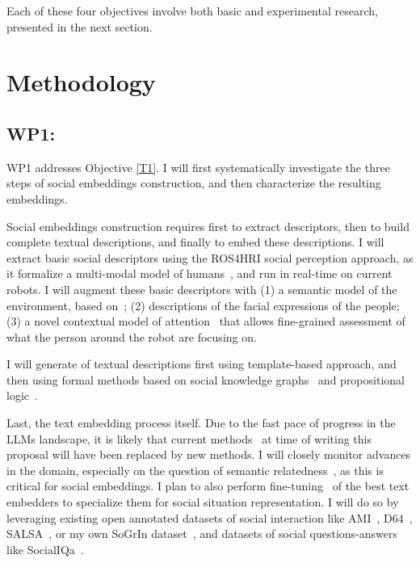 Each of these four objectives involve both basic and experimental research,
presented in the next section.



\section{Methodology}



\subsection{WP1: \textbf{\wpOne}}

WP1 addresses Objective \ref{T1}. I will first systematically investigate the
three steps of social embeddings construction, and then characterize the
resulting embeddings.

Social embeddings construction requires first to extract descriptors, then to
build complete textual descriptions, and finally to embed these descriptions.  I
will extract basic social descriptors using the ROS4HRI social perception
approach, as it formalize a multi-modal model of humans~\cite{lemaignan2022ros},
and run in real-time on current robots. I will augment these basic descriptors
with (1) a semantic model of the environment, based
on~\cite{lemaignan2018underworlds}; (2) descriptions of the facial expressions
of the people; (3) a novel contextual model of
attention~\cite{ferrini2024percepts} that allows fine-grained assessment of what
the person around the robot are focusing on.

I will generate of textual descriptions first using template-based approach, and
then using formal methods based on social knowledge graphs~\cite{sap2019atomic}
and propositional logic~\cite{tsoi2022sean}.

Last, the text embedding process itself. Due to the fast pace of progress in the
LLMs landscape, it is likely that current
methods~\cite{reimers2019sentencebert,muennighoff2022sgpt} at time of writing
this proposal will have been replaced by new methods. I will closely monitor
advances in the domain, especially on the question of semantic
relatedness~\cite{thakur2021beir}, as this is critical for social
embeddings. I plan to also perform fine-tuning~\cite{hadsell2006dimensionality}
of the best text embedders to specialize them for social situation
representation. I will do so by leveraging existing open annotated datasets of
social interaction like AMI~\cite{carletta2007ami}, D64~\cite{oertel2013d64},
SALSA~\cite{alameda2015salsa}, or my own SoGrIn dataset~\cite{webb2023sogrin},
and datasets of social questions-answers like SocialIQa~\cite{sap2019social}.

